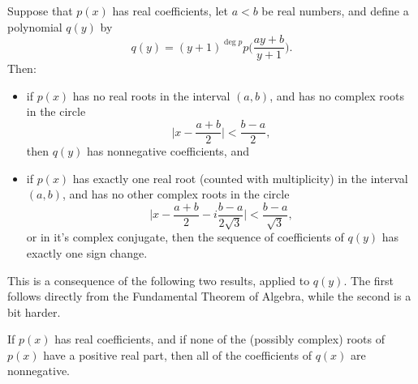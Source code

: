 \begin{thm} Suppose that $p(x)$ has real coefficients, let $a < b$ be real numbers, and define a polynomial $q(y)$ by
\[
q(y) = (y+1)^{\deg p}p\Big(\frac{ay + b}{y + 1}\Big).
\]
Then:
\begin{itemize}
\item if $p(x)$ has no real roots in the interval $(a,b)$, and has no complex roots in the circle
\[
\Big|x - \frac{a+b}{2}\Big| < \frac{b-a}{2},
\]
then $q(y)$ has nonnegative coefficients, and

\item if $p(x)$ has exactly one real root (counted with multiplicity) in the interval $(a,b)$, and has no other complex roots in the circle
\[
\Big|x - \frac{a+b}{2} - i\frac{b-a}{2\sqrt{3}}\Big| < \frac{b-a}{\sqrt{3}},
\]
or in it's complex conjugate, then the sequence of coefficients of $q(y)$ has exactly one sign change.
\end{itemize}
\end{thm}

This is a consequence of the following two results, applied to $q(y)$. The first follows directly from the Fundamental Theorem of Algebra, while the second is a bit harder.

\begin{prop} If $p(x)$ has real coefficients, and if none of the (possibly complex) roots of $p(x)$ have a positive real part, then all of the coefficients of $q(x)$ are nonnegative.
\end{prop}

